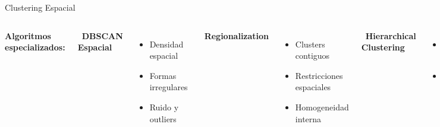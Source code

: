 \documentclass[10pt,aspectratio=169]{beamer}
\begin{document}
\begin{frame}{Clustering Espacial}
    \begin{columns}
        \textbf{Algoritmos especializados:}

        \vspace{2mm}
        \faMapPin\ \textbf{DBSCAN Espacial}
        \begin{itemize}
            \item Densidad espacial
            \item Formas irregulares
            \item Ruido y outliers
        \end{itemize}

        \vspace{2mm}
        \faChartBar\ \textbf{Regionalization}
        \begin{itemize}
            \item Clusters contiguos
            \item Restricciones espaciales
            \item Homogeneidad interna
        \end{itemize}

        \vspace{2mm}
        \faLayerGroup\ \textbf{Hierarchical Clustering}
        \begin{itemize}
            \item Múltiples escalas
            \item Dendrogramas espaciales
        \end{itemize}

        \begin{lstlisting}[language=Python,basicstyle=\tiny]
from sklearn.cluster import DBSCAN
from pysal.lib import weights
from pysal.explore import esda

# DBSCAN espacial
coords = np.column_stack([gdf.x, gdf.y])
db = DBSCAN(eps=0.5, min_samples=5)
gdf['cluster'] = db.fit_predict(coords)

# Regionalización con restricciones
from pysal.lib.region import max_p_regions

w = weights.Queen.from_dataframe(gdf)
attrs = gdf[['income', 'education']].values

gdf['region'] = max_p_regions(
    w, attrs,
    threshold=1000,
    solver='greedy'
)
        \end{lstlisting}
    \end{columns}
\end{frame}
\end{document}
